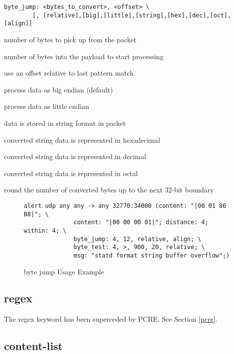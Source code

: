 \documentclass[english]{report}
\begin{document}
\begin{verbatim}
byte_jump: <bytes_to_convert>, <offset> \
        [, [relative],[big],[little],[string],[hex],[dec],[oct],[align]]
\end{verbatim}

\begin{description}{}
\item [bytes\_to\_convert]number of bytes to pick up from the packet
\item [offset]number of bytes into the payload to start processing
\item [relative]use an offset relative to last pattern match
\item [big]process data as big endian (default)
\item [little]process data as little endian
\item [string]data is stored in string format in packet
\item [hex]converted string data is represented in hexadecimal
\item [dec]converted string data is represented in decimal
\item [oct]converted string data is represented in octal
\item [align]round the number of converted bytes up to the next 32-bit boundary
\end{description}

\begin{figure}[!hbpt]
\begin{verbatim}
alert udp any any -> any 32770:34000 (content: "|00 01 86 B8|"; \
              content: "|00 00 00 01|"; distance: 4; within: 4; \
              byte_jump: 4, 12, relative, align; \
              byte_test: 4, >, 900, 20, relative; \
              msg: "statd format string buffer overflow";)
\end{verbatim}
\caption{byte jump Usage Example \label{fig:byte_jump}}
\end{figure}

\subsection{regex}

The regex keyword has been superceded by PCRE.  See Section \ref{pcre}.

\subsection{content-list}
\end{document}

